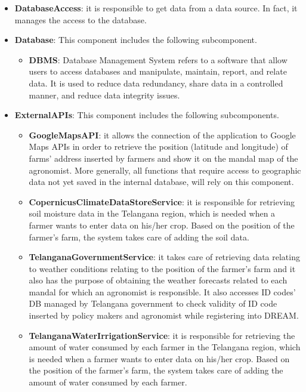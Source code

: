 \begin{itemize}
\item \textbf{DatabaseAccess}: it is responsible to get data from a data source. In fact, it manages the access to the database.

\item \textbf{Database}: This component includes the following subcomponent.

\begin{itemize}
    \item \textbf{DBMS}: Database Management System refers to a software that allow users to access databases and manipulate, maintain, report, and relate data. It is used to reduce data redundancy, share data in a controlled manner, and reduce data integrity issues.
\end{itemize}

\item \textbf{ExternalAPIs}: This component includes the following subcomponents.

\begin{itemize}
    \item \textbf{GoogleMapsAPI}: it allows the connection of the application to Google Maps APIs in order to retrieve the position (latitude and longitude) of farms’ address inserted by farmers and show it on the mandal map of the agronomist. More generally, all functions that require access to geographic data not yet saved in the internal database, will rely on this component.
    \item \textbf{CopernicusClimateDataStoreService}: it is responsible for retrieving soil moisture data in the Telangana region, which is needed when a farmer wants to enter data on his/her crop. Based on the position of the farmer's farm, the system takes care of adding the soil data.
    \item \textbf{TelanganaGovernmentService}: it takes care of retrieving data relating to weather conditions relating to the position of the farmer's farm and it also has the purpose of obtaining the weather forecasts related to each mandal for which an agronomist is responsible. It also accesses ID codes' DB managed by Telangana government to check validity of ID code inserted by policy makers and agronomist while registering into DREAM. 
    \item \textbf{TelanganaWaterIrrigationService}: it is responsible for retrieving the amount of water consumed by each farmer in the Telangana region, which is needed when a farmer wants to enter data on his/her crop. Based on the position of the farmer's farm, the system takes care of adding the amount of water consumed by each farmer.
\end{itemize}

\end{itemize}


